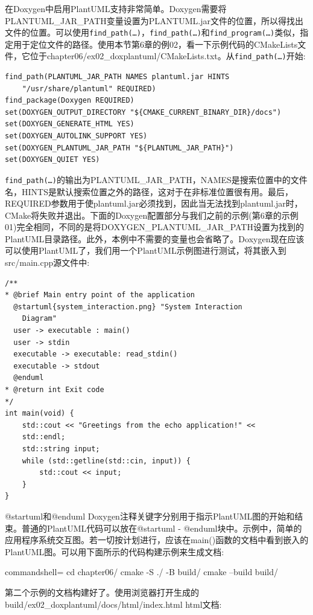 在Doxygen中启用PlantUML支持非常简单。Doxygen需要将PLANTUML\_JAR\_PATH变量设置为PLANTUML.jar文件的位置，所以得找出文件的位置。可以使用\texttt{find\_path(…)}，\texttt{find\_path(…)}和\texttt{find\_program(…)}类似，指定用于定位文件的路径。使用本节第6章的例02，看一下示例代码的CMakeLists文件，它位于chapter06/ex02\_doxplantuml/CMakeLists.txt。从\texttt{find\_path(…)}开始:

\begin{lstlisting}[style=styleCMake]
find_path(PLANTUML_JAR_PATH NAMES plantuml.jar HINTS
	"/usr/share/plantuml" REQUIRED)
find_package(Doxygen REQUIRED)
set(DOXYGEN_OUTPUT_DIRECTORY "${CMAKE_CURRENT_BINARY_DIR}/docs")
set(DOXYGEN_GENERATE_HTML YES)
set(DOXYGEN_AUTOLINK_SUPPORT YES)
set(DOXYGEN_PLANTUML_JAR_PATH "${PLANTUML_JAR_PATH}")
set(DOXYGEN_QUIET YES)
\end{lstlisting}

\texttt{find\_path(…)}的输出为PLANTUML\_JAR\_PATH，NAMES是搜索位置中的文件名，HINTS是默认搜索位置之外的路径，这对于在非标准位置很有用。最后，REQUIRED参数用于使plantuml.jar必须找到，因此当无法找到plantuml.jar时，CMake将失败并退出。下面的Doxygen配置部分与我们之前的示例(第6章的示例01)完全相同，不同的是将DOXYGEN\_PLANTUML\_JAR\_PATH设置为找到的PlantUML目录路径。此外，本例中不需要的变量也会省略了。Doxygen现在应该可以使用PlantUML了，我们用一个PlantUML示例图进行测试，将其嵌入到src/main.cpp源文件中:

\begin{lstlisting}[style=styleCXX]
/**
* @brief Main entry point of the application
  @startuml{system_interaction.png} "System Interaction
    Diagram"
  user -> executable : main()
  user -> stdin
  executable -> executable: read_stdin()
  executable -> stdout
  @enduml
* @return int Exit code
*/
int main(void) {
	std::cout << "Greetings from the echo application!" <<
	std::endl;
	std::string input;
	while (std::getline(std::cin, input)) {
		std::cout << input;
	}
}
\end{lstlisting}

@startuml和@enduml Doxygen注释关键字分别用于指示PlantUML图的开始和结束。普通的PlantUML代码可以放在@startuml - @enduml块中。示例中，简单的应用程序系统交互图。若一切按计划进行，应该在main()函数的文档中看到嵌入的PlantUML图。可以用下面所示的代码构建示例来生成文档:
 
\begin{tcblisting}{commandshell={}}
cd chapter06/
cmake -S ./ -B build/
cmake --build build/
\end{tcblisting}

第二个示例的文档构建好了。使用浏览器打开生成的build/ex02\_doxplantuml/docs/html/index.html html文档:

